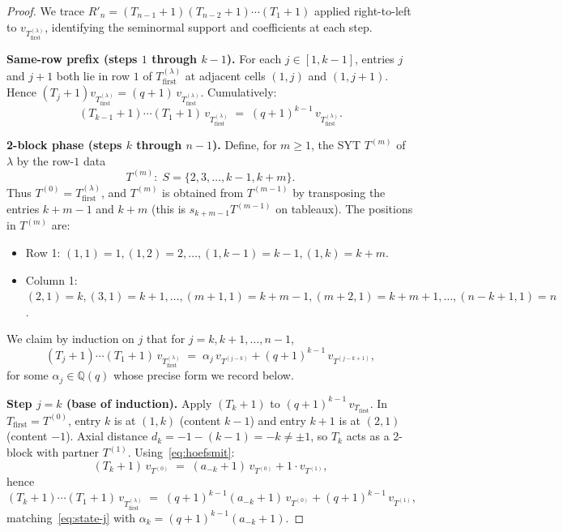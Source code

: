 \documentclass[11pt]{article}
\theoremstyle{definition}
\begin{document}
\begin{proof}
We trace $R'_n = (T_{n-1}{+}1)(T_{n-2}{+}1)\cdots(T_1{+}1)$ applied
right-to-left to $v_{T_{\mathrm{first}}^{(\lambda)}}$, identifying the
seminormal support and coefficients at each step.

\textbf{Same-row prefix (steps $1$ through $k-1$).}  For each
$j \in [1, k-1]$, entries $j$ and $j+1$ both lie in row $1$ of
$T_{\mathrm{first}}^{(\lambda)}$ at adjacent cells $(1,j)$ and $(1,j+1)$.
Hence $(T_j + 1) v_{T_{\mathrm{first}}^{(\lambda)}} = (q+1)\, v_{T_{\mathrm{first}}^{(\lambda)}}$.
Cumulatively:
\[
   (T_{k-1}+1)\cdots(T_1+1)\, v_{T_{\mathrm{first}}^{(\lambda)}}
   \;=\; (q+1)^{k-1}\, v_{T_{\mathrm{first}}^{(\lambda)}}.
\]

\textbf{2-block phase (steps $k$ through $n-1$).}  Define, for $m \ge 1$,
the SYT $T^{(m)}$ of $\lambda$ by the row-$1$ data
\[
   T^{(m)}: \; S = \{2, 3, \ldots, k-1, k+m\}.
\]
Thus $T^{(0)} = T_{\mathrm{first}}^{(\lambda)}$, and $T^{(m)}$ is
obtained from $T^{(m-1)}$ by transposing the entries $k+m-1$ and $k+m$
(this is $s_{k+m-1} T^{(m-1)}$ on tableaux).  The positions in $T^{(m)}$
are:
\begin{itemize}[leftmargin=2em,topsep=0.2em,itemsep=0.1em]
\item Row 1: $(1, 1) = 1, (1, 2) = 2, \ldots, (1, k-1) = k-1, (1, k) = k+m$.
\item Column 1: $(2, 1) = k, (3, 1) = k+1, \ldots, (m+1, 1) = k+m-1,
   (m+2, 1) = k+m+1, \ldots, (n-k+1, 1) = n$.
\end{itemize}
We claim by induction on $j$ that for $j = k, k+1, \ldots, n-1$,
\begin{equation}\label{eq:state-j}
   (T_j+1)\cdots(T_1+1)\, v_{T_{\mathrm{first}}^{(\lambda)}}
   \;=\; \alpha_j\, v_{T^{(j-k)}} + (q+1)^{k-1}\, v_{T^{(j-k+1)}},
\end{equation}
for some $\alpha_j \in \mathbb{Q}(q)$ whose precise form we record below.

\textbf{Step $j = k$ (base of induction).}  Apply $(T_k + 1)$ to
$(q+1)^{k-1}\, v_{T_{\mathrm{first}}}$.  In $T_{\mathrm{first}} = T^{(0)}$,
entry $k$ is at $(1, k)$ (content $k-1$) and entry $k+1$ is at $(2, 1)$
(content $-1$).  Axial distance $d_k = -1 - (k-1) = -k \ne \pm 1$, so
$T_k$ acts as a 2-block with partner $T^{(1)}$.  Using~\eqref{eq:hoefsmit}:
\[
   (T_k+1)\, v_{T^{(0)}}
   \;=\; (a_{-k} + 1)\,v_{T^{(0)}} + 1 \cdot v_{T^{(1)}},
\]
hence
\[
   (T_k+1)\cdots(T_1+1)\, v_{T_{\mathrm{first}}^{(\lambda)}}
   \;=\; (q+1)^{k-1}(a_{-k} + 1)\,v_{T^{(0)}} + (q+1)^{k-1}\,v_{T^{(1)}},
\]
matching~\eqref{eq:state-j} with $\alpha_k = (q+1)^{k-1}(a_{-k}+1)$.


\end{proof}
\end{document}
